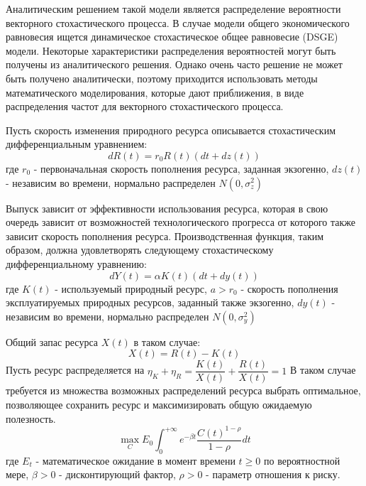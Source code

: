 \documentclass[12pt,a4paper, oneside]{extreport}
\begin{document}
Аналитическим решением такой модели является распределение вероятности векторного стохастического процесса. В случае модели общего экономического равновесия ищется динамическое стохастическое общее равновесие (DSGE) модели. Некоторые характеристики распределения вероятностей могут быть получены из аналитического решения. Однако  очень часто решение не может быть получено аналитически, поэтому приходится использовать  методы математического моделирования,  которые дают приближения, в виде распределения частот для векторного стохастического процесса. 



Пусть  скорость изменения  природного ресурса описывается  стохастическим   дифференциальным   уравнением:
\begin{equation}\label{key}
d R (t) = r_0 R (t) (dt + dz (t)) 
\end{equation}
где $ r_0 $ - первоначальная скорость    пополнения ресурса, заданная экзогенно, $ dz(t)  $  -   независим во времени, нормально распределен $ N(0, \sigma_{z}^{2}) $ 

Выпуск  зависит от эффективности использования ресурса, которая в свою очередь зависит от возможностей технологического прогресса от которого также зависит скорость пополнения ресурса. 
Производственная функция,  таким образом, должна  удовлетворять следующему стохастическому дифференциальному уравнению:
\begin{equation}\label{key}
dY (t) = \alpha K(t) ( dt  + dy (t)) 
\end{equation}
где $ K(t) $ - используемый  природный ресурс, $ a > r_0 $ -
скорость   пополнения   эксплуатируемых природных ресурсов, заданный  также экзогенно,  $ dy(t) $   -   независим во времени, нормально распределен $ N(0, \sigma_{y}^{2}) $ 

Общий запас ресурса $ X(t) $ в таком случае: 
\begin{equation}\label{eqq1}
 X (t) = R (t) - K(t)
 \end{equation}
 Пусть ресурс распределяется на $ \eta_K + \eta_R = \dfrac{K(t)}{X(t)} + \dfrac{R(t)}{X(t)}  = 1 $ 
В таком случае требуется из множества возможных распределений ресурса выбрать оптимальное,   позволяющее сохранить ресурс и  максимизировать  общую ожидаемую полезность.
\begin{equation}\label{tt}
\max_C E_0 \int_{0}^{+ \infty}  e^{-\beta t} \dfrac{C(t)^{1-\rho}}{1-\rho}  dt 
\end{equation}
где $ E_t $ - математическое ожидание в  момент времени $ t \geq 0 $  по  вероятностной мере, $ \beta > 0  $  - дисконтирующий  фактор, $ \rho > 0  $   -  параметр отношения к риску.
\end{document}
